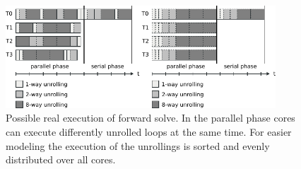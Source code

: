 \begin{figure}[t]
  \centering
  \includegraphics[width=0.9\textwidth,clip=true]{images/ecm-parallel-model}
   \caption{Possible real execution of forward solve. In the parallel phase cores can execute differently unrolled loops at the same time. For easier modeling the execution of the unrollings is sorted and evenly distributed over all cores.}
  \label{fig:ecm-parallel-model}%
\end{figure}

